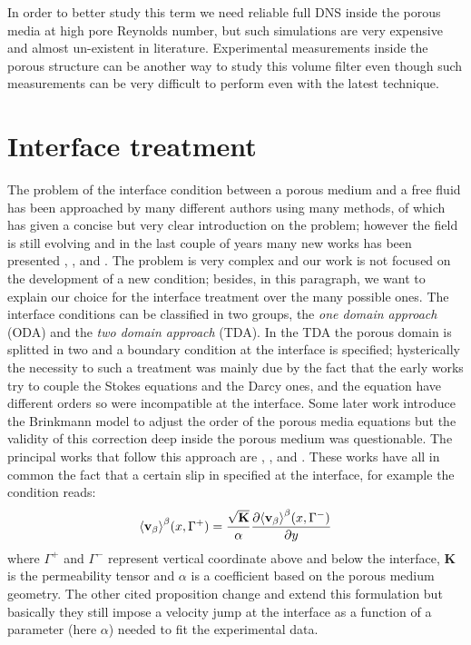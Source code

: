 In order to better study this term we need reliable full DNS inside the porous media at high pore Reynolds number, but such simulations are very expensive and almost un-existent in literature.
Experimental measurements inside the porous structure can be another way to study this volume filter even though such measurements can be very difficult to perform even with the latest technique.

\section{Interface treatment}
\label{ch:interface}

The problem of the interface condition between a porous medium and a free fluid has been approached by many different authors using many methods, of which \citet{ehrhardt2010interface} has given a concise but very clear introduction on the problem; however the field is still evolving and in the last couple of years many new works has been presented \citet{minale2014momentum}, \citet{angot2017asymptotic}, \citet{lacis2017framework} and .
The problem is very complex and our work is not focused on the development of a new condition; besides, in this paragraph, we want to explain our choice for the interface treatment over the many possible ones.
The interface conditions can be classified in two groups, the \textit{one domain approach} (ODA) and the \textit{two domain approach} (TDA).
In the TDA the porous domain is splitted in two and a boundary condition at the interface is specified; hysterically the necessity to such a treatment was mainly due by the fact that the early works try to couple the Stokes equations and the Darcy ones, and the equation have different orders so were incompatible at the interface.
Some later work introduce the Brinkmann model to adjust the order of the porous media equations but the validity of this correction deep inside the porous medium was questionable.
The principal works that follow this approach are \citet{beavers1967boundary}, \citet{mikelic2000interface}, \citet{ochoa1995momentum} and \citet{le2006interfacial}.
These works have all in common the fact that a certain slip in specified at the interface, for example the condition\citet{beavers1967boundary} reads:
$$
{\left< \textbf{v}_{\beta} \right>}^{\beta}(x,\Gamma^+) = \dfrac{\sqrt{\mathbf{K}}}{\alpha} \dfrac{\partial {\left< \textbf{v}_{\beta}\right>}^{\beta}(x, \Gamma^-)}{\partial y}
$$
where $\Gamma^+$ and $\Gamma^-$ represent vertical coordinate above and below the interface, $\mathbf{K}$ is the permeability tensor and $\alpha$ is a coefficient based on the porous medium geometry.
The other cited proposition change and extend this formulation but basically they still impose a velocity jump at the interface as a function of a parameter (here $\alpha$) needed to fit the experimental data.

